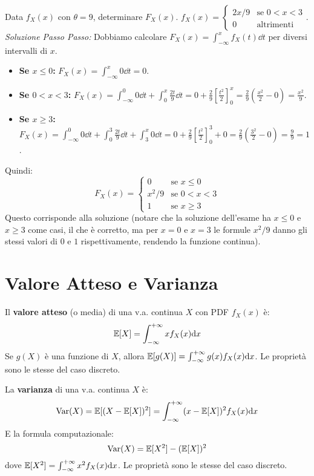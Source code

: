 \documentclass[12pt,a4paper]{article}
\begin{document}
\begin{example}
\begin{example}
Data $f_X(x)$ con $\theta=9$, determinare $F_X(x)$.
$f_X(x) = \begin{cases} 2x/9 & \text{se } 0 < x < 3 \\ 0 & \text{altrimenti} \end{cases}$.
\textit{Soluzione Passo Passo:}
Dobbiamo calcolare $F_X(x) = \int_{-\infty}^x f_X(t) \dd t$ per diversi intervalli di $x$.
\begin{itemize}
    \item \textbf{Se $x \le 0$:}
    $F_X(x) = \int_{-\infty}^x 0 \dd t = 0$.
    \item \textbf{Se $0 < x < 3$:}
    $F_X(x) = \int_{-\infty}^0 0 \dd t + \int_0^x \frac{2t}{9} \dd t = 0 + \frac{2}{9} \left[ \frac{t^2}{2} \right]_0^x = \frac{2}{9} \left( \frac{x^2}{2} - 0 \right) = \frac{x^2}{9}$.
    \item \textbf{Se $x \ge 3$:}
    $F_X(x) = \int_{-\infty}^0 0 \dd t + \int_0^3 \frac{2t}{9} \dd t + \int_3^x 0 \dd t = 0 + \frac{2}{9} \left[ \frac{t^2}{2} \right]_0^3 + 0 = \frac{2}{9} \left( \frac{3^2}{2} - 0 \right) = \frac{9}{9} = 1$.
\end{itemize}
Quindi:
\[ F_X(x) = \begin{cases} 0 & \text{se } x \le 0 \\ x^2/9 & \text{se } 0 < x < 3 \\ 1 & \text{se } x \ge 3 \end{cases} \]
Questo corrisponde alla soluzione (notare che la soluzione dell'esame ha $x \le 0$ e $x \ge 3$ come casi, il che è corretto, ma per $x=0$ e $x=3$ le formule $x^2/9$ danno gli stessi valori di $0$ e $1$ rispettivamente, rendendo la funzione continua).
\end{example}

\section{Valore Atteso e Varianza}
\begin{definition}
Il \textbf{valore atteso} (o media) di una v.a. continua $X$ con PDF $f_X(x)$ è:
\[ \mathbb{E}[X] = \int_{-\infty}^{+\infty} x f_X(x) \mathrm{d} x \]
Se $g(X)$ è una funzione di $X$, allora $\mathbb{E}[g(X)] = \int_{-\infty}^{+\infty} g(x) f_X(x) \mathrm{d} x$.
Le proprietà sono le stesse del caso discreto.
\end{definition}

\begin{definition}[Varianza]
La \textbf{varianza} di una v.a. continua $X$ è:
\[ \mathrm{Var}(X) = \mathbb{E}[(X - \mathbb{E}[X])^2] = \int_{-\infty}^{+\infty} (x - \mathbb{E}[X])^2 f_X(x) \mathrm{d} x \]
E la formula computazionale:
\[ \mathrm{Var}(X) = \mathbb{E}[X^2] - (\mathbb{E}[X])^2 \]
dove $\mathbb{E}[X^2] = \int_{-\infty}^{+\infty} x^2 f_X(x) \mathrm{d} x$.
Le proprietà sono le stesse del caso discreto.
\end{definition}


\end{example}
\end{document}
